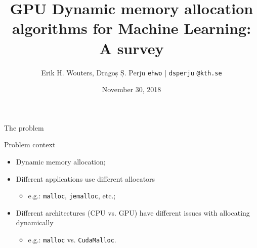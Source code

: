 \documentclass[10pt]{beamer}
\title{GPU Dynamic memory allocation algorithms for Machine Learning: A survey}
\author{Erik H. Wouters, Dragoș Ș. Perju \quad \texttt{ehwo} | \texttt{dsperju}  \texttt{@kth.se}}
\date{November 30, 2018}
\institute{KTH Royal University of Technology \quad Stockholm, Sweden}
\begin{document}
\maketitle






\begin{frame}[fragile]{The problem}


\begin{exampleblock}{Problem context}
 \begin{itemize}
 \item Dynamic memory allocation;
 \item Different applications use different allocators
     \begin{itemize}
         \item e.g.: \texttt{malloc}, \texttt{jemalloc}, etc.;
     \end{itemize}
 \item Different architectures (CPU vs. GPU) have different issues with allocating dynamically
     \begin{itemize}
         \item e.g.: \texttt{malloc} vs. \texttt{CudaMalloc}.
     \end{itemize}
 \end{itemize}
\end{exampleblock}
\end{frame}
\end{document}

